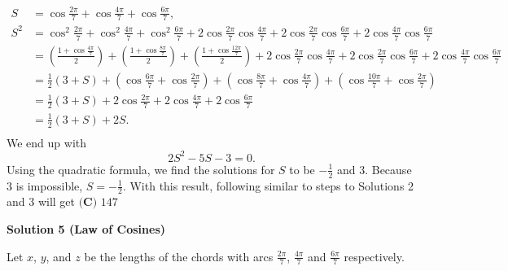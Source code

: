 \begin{enumerate}
 \begin{align*} S &= \cos \frac{2\pi}{7} + \cos \frac{4\pi}{7} + \cos \frac{6\pi}{7}, \\ S^2 &= \cos^2 \frac{2\pi}{7} + \cos^2 \frac{4\pi}{7} + \cos^2 \frac{6\pi}{7} + 2\cos \frac{2\pi}{7}\cos \frac{4\pi}{7} + 2\cos \frac{2\pi}{7}\cos \frac{6\pi}{7} + 2\cos \frac{4\pi}{7}\cos \frac{6\pi}{7} \\ &= \left(\frac{1+ \cos \frac{4\pi}{7}}{2}\right) + \left(\frac{1+ \cos \frac{8\pi}{7}}{2}\right) + \left(\frac{1+ \cos \frac{12\pi}{7}}{2}\right) + 2\cos \frac{2\pi}{7}\cos \frac{4\pi}{7} + 2\cos \frac{2\pi}{7}\cos \frac{6\pi}{7} + 2\cos \frac{4\pi}{7}\cos \frac{6\pi}{7} \\ &= \frac{1}{2}(3 + S)  + \left(\cos \frac{6\pi}{7} + \cos \frac{2\pi}{7}\right) + \left(\cos \frac{8\pi}{7} + \cos \frac{4\pi}{7}\right) + \left(\cos \frac{10\pi}{7} + \cos \frac{2\pi}{7}\right) \\ &= \frac{1}{2}(3 + S) + 2\cos \frac{2\pi}{7} + 2\cos \frac{4\pi}{7} + 2\cos \frac{6\pi}{7}\\ &= \frac{1}{2}(3 + S) + 2S. \\ \end{align*}
We end up with 
 \[2S^2 - 5S - 3 = 0.\]Using the quadratic formula, we find the solutions for $S$ to be $-\frac{1}{2}$ and $3$. Because $3$ is impossible, $S = -\frac{1}{2}$.  With this result, following similar to steps to Solutions 2 and 3 will get $\boxed{\textbf{(C) }147}$




\textbf{Solution 5 (Law of Cosines)}

Let $x$, $y$, and $z$ be the lengths of the chords with arcs $\frac{2\pi}{7}$, $\frac{4\pi}{7}$ and $\frac{6\pi}{7}$ respectively. 


\end{enumerate}
